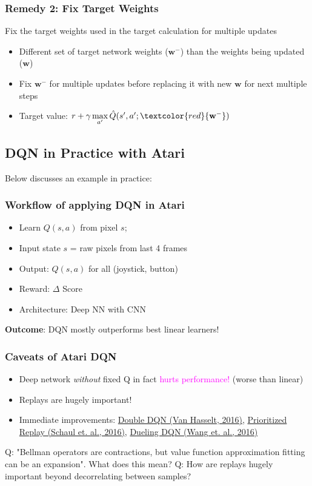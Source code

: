 \documentclass{article}
\begin{document}
\begin{defbox}
    \subsubsection*{Remedy 2: Fix Target Weights}
    Fix the target weights used in the target calculation for multiple updates
    \begin{itemize}
    \item Different set of target network weights ($\mathbf{w}^{-}$) than the weights being updated ($\mathbf{w}$)
    \item Fix $\mathbf{w}^{-}$ for multiple updates before replacing it with new $\mathbf{w}$ for next multiple steps
    \item Target value: $r + \gamma \mathop{\max}\limits_{a'} \hat{Q}(s', a'; \textcolor{red}{\mathbf{w}^{-}})$
    \end{itemize}
\end{defbox}

\subsection{DQN in Practice with Atari}
Below discusses an example in practice:

\begin{expbox}
    \subsubsection*{Workflow of applying DQN in Atari}
    \begin{itemize}
    \item Learn $Q(s, a)$ from pixel $s$;
    \item Input state $s$ = raw pixels from last 4 frames
    \item Output: $Q(s, a)$ for all (joystick, button)
    \item Reward: $\Delta$ Score
    \item Architecture: Deep NN with CNN 
    \end{itemize}
    \textbf{Outcome}: DQN mostly outperforms best linear learners!
\end{expbox}

\begin{hintbox}
    \subsubsection*{Caveats of Atari DQN}
    \begin{itemize}
    \item Deep network \textit{without} fixed Q in fact \textcolor{magenta}{hurts performance!} (worse than linear)
    \item Replays are hugely important!
    \item Immediate improvements: 
        \href{https://arxiv.org/abs/1509.06461}{Double DQN (Van Hasselt, 2016)},
        \href{https://arxiv.org/pdf/1511.05952}{Prioritized Replay (Schaul et. al., 2016)},
        \href{https://arxiv.org/abs/1511.06581}{Dueling DQN (Wang et. al., 2016)}
    \end{itemize}
\end{hintbox}

\begin{hintbox}
    Q: "Bellman operators are contractions, but value function approximation fitting can be an expansion". What does this mean?
    Q: How are replays hugely important beyond decorrelating between samples?
\end{hintbox}
\end{document}
